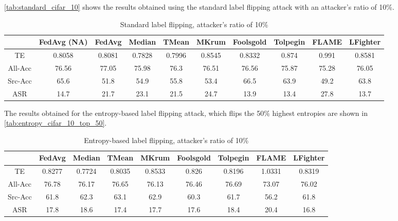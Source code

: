 \autoref{tab:standard_cifar_10} shows the results obtained using the standard label flipping attack with an attacker's ratio of 10\%.
\begin{table}[h!]
        \centering
        \small
        \begin{adjustbox}{center}
        \begin{tabular}{|c|c|c|c|c|c|c|c|c|c|}
                \hline
                & FedAvg (NA) & FedAvg & Median & TMean & MKrum & Foolsgold & Tolpegin & FLAME & LFighter \\
                \hline
                TE & 0.8058 & 0.8081 & 0.7828 & 0.7996 & 0.8545 & 0.8332 & 0.874 & 0.991 & 0.8581 \\
                \hline
                All-Acc & 76.56 & 77.05 & 75.98 & 76.3 & 76.51 & 76.56 & 75.87 & 75.28 & 76.05 \\
                \hline
                Src-Acc & 65.6 & 51.8 & 54.9 & 55.8 & 53.4 & 66.5 & 63.9 & 49.2 & 63.8 \\
                \hline
                ASR & 14.7 & 21.7 & 23.1 & 21.5 & 24.7 & 13.9 & 13.4 & 27.8 & 13.7 \\
                \hline
        \end{tabular}
        \end{adjustbox}
        \caption{Standard label flipping, attacker's ratio of 10\%}
        \label{tab:standard_cifar_10}
    \end{table}


The results obtained for the entropy-based label flipping attack, which flips the 50\% highest entropies are shown in \autoref{tab:entropy_cifar_10_top_50}.
\begin{table}[h!]
    \centering
    \small
    \begin{adjustbox}{center}
    \begin{tabular}{|c|c|c|c|c|c|c|c|c|}
        \hline
        & FedAvg & Median & TMean & MKrum & Foolsgold & Tolpegin & FLAME & LFighter \\
        \hline
        TE & 0.8277 & 0.7724 & 0.8035 & 0.8533 & 0.826 & 0.8196 & 1.0331 & 0.8319 \\
        \hline
        All-Acc & 76.78 & 76.17 & 76.65 & 76.13 & 76.46 & 76.69 & 73.07 & 76.02 \\
        \hline
        Src-Acc & 61.8 & 62.3 & 63.1 & 62.9 & 60.3 & 61.7 & 56.2 & 61.8 \\
        \hline
        ASR & 17.8 & 18.6 & 17.4 & 17.7 & 17.6 & 18.4 & 20.4 & 16.8 \\
        \hline
    \end{tabular}
    \end{adjustbox}
    \caption{Entropy-based label flipping, attacker's ratio of 10\%}
    \label{tab:entropy_cifar_10_top_50}
\end{table}


